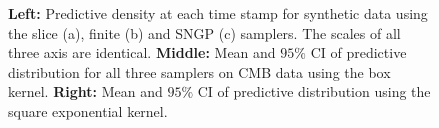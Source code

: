 \begin{figure}[t]
\begin{center}
{    }
  \end{center}
  \caption{\textbf{Left:} Predictive density at each time stamp for synthetic
  data using the slice (a), finite (b) and SNGP (c) samplers.  The scales of
  all three axis are identical.  \textbf{Middle:}
  Mean and $95\%$ CI of predictive distribution for all three
  samplers on CMB data using the box kernel.  \textbf{Right:} Mean and $95\%$
  CI of predictive distribution using the square exponential kernel.}
  \label{fig:preddens}
\end{figure}

